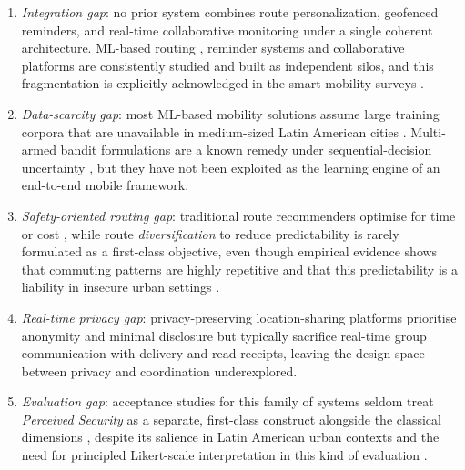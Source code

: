 \documentclass[a4paper,fleqn]{cas-sc}
\begin{document}
	\begin{enumerate}
		\item \emph{Integration gap}: no prior system combines route personalization, geofenced reminders, and real-time collaborative monitoring under a single coherent architecture. ML-based routing \citep{yuan2022mlits,guo2021online,liu2022multimodal,campigotto2017favour}, reminder systems \citep{lin2014lbr,garzon2014geofencing,wang2015beyond,shevchenko2024geofencing} and collaborative platforms \citep{li2017locsharing,mckenzie2022privyto,shokri2014mobicrowd,kim2025crimesafetymap} are consistently studied and built as independent silos, and this fragmentation is explicitly acknowledged in the smart-mobility surveys \citep{paiva2021smartmobility,kung2023lbs}.
		\item \emph{Data-scarcity gap}: most ML-based mobility solutions assume large training corpora that are unavailable in medium-sized Latin American cities \citep{yuan2022mlits,liu2022multimodal,zhang2025drlnavigation}. Multi-armed bandit formulations are a known remedy under sequential-decision uncertainty \citep{bouneffouf2020mabsurvey,zeng2016mab,shi2021fedmab}, but they have not been exploited as the learning engine of an end-to-end mobile framework.
		\item \emph{Safety-oriented routing gap}: traditional route recommenders optimise for time or cost \citep{campigotto2017favour,guo2021online,liu2022multimodal,zhang2025drlnavigation}, while route \emph{diversification} to reduce predictability is rarely formulated as a first-class objective, even though empirical evidence shows that commuting patterns are highly repetitive \citep{song2010predictability,cagney2025urban,liu2022route} and that this predictability is a liability in insecure urban settings \citep{tapia2024inseguridad,maloney2025worldbank}.
		\item \emph{Real-time privacy gap}: privacy-preserving location-sharing platforms \citep{li2017locsharing,mckenzie2022privyto,shokri2014mobicrowd} prioritise anonymity and minimal disclosure but typically sacrifice real-time group communication with delivery and read receipts, leaving the design space between privacy and coordination underexplored.
		\item \emph{Evaluation gap}: acceptance studies for this family of systems seldom treat \emph{Perceived Security} as a separate, first-class construct alongside the classical \TAM{} dimensions \citep{davis1989tam}, despite its salience in Latin American urban contexts \citep{tapia2024inseguridad,maloney2025worldbank} and the need for principled Likert-scale interpretation in this kind of evaluation \citep{lindner2024likert}.
	\end{enumerate}
	
\end{document}
